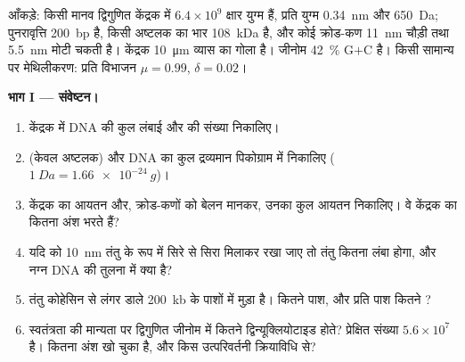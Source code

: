 \begin{problem}
\label{pb:b3:chromatin-epigenetics:1}
आँकड़े: किसी मानव द्विगुणित केंद्रक में $6.4\times 10^{9}$ क्षार युग्म
हैं, प्रति युग्म \qty{0.34}{nm} और \qty{650}{Da}; 
पुनरावृत्ति \qty{200}{bp} है, किसी  अष्टलक का भार
\qty{108}{kDa} है, और कोई क्रोड-कण \qty{11}{nm} चौड़ी तथा \qty{5.5}{nm}
मोटी चकती है। केंद्रक \qty{10}{\micro m} व्यास का गोला है। जीनोम
\qty{42}{\%} G$+$C है। किसी सामान्य  पर मेथिलीकरण: प्रति विभाजन
$\mu = 0.99$, $\delta = 0.02$।

\medskip
\noindent\textbf{भाग I --- संवेष्टन।}
\begin{enumerate}
  \item केंद्रक में DNA की कुल लंबाई और  की संख्या
        निकालिए।
  \item {} (केवल अष्टलक) और DNA का कुल द्रव्यमान पिकोग्राम में
        निकालिए ($\qty{1}{Da} = \qty{1.66e-24}{g}$)।
  \item केंद्रक का आयतन और, क्रोड-कणों को बेलन मानकर, उनका कुल आयतन
        निकालिए। वे केंद्रक का कितना अंश भरते हैं?
  \item यदि  को \qty{10}{nm} तंतु के रूप में सिरे से
        सिरा मिलाकर रखा जाए तो तंतु कितना लंबा होगा, और नग्न DNA की
        तुलना में  क्या है?
  \item तंतु कोहेसिन से लंगर डाले \qty{200}{kb} के पाशों में मुड़ा है।
        कितने पाश, और प्रति पाश कितने ?
  \item स्वतंत्रता की मान्यता पर द्विगुणित जीनोम में कितने 
        द्विन्यूक्लियोटाइड होते? प्रेक्षित संख्या $5.6\times 10^{7}$
        है। कितना अंश खो चुका है, और किस उत्परिवर्तनी क्रियाविधि से?
\end{enumerate}


\end{problem}
